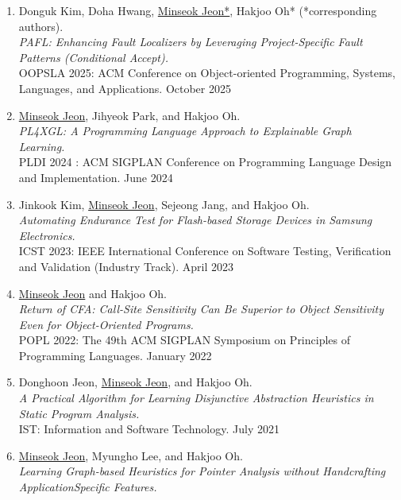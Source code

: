 \documentclass[letterpaper,11pt]{article}
\begin{document}
\begin{enumerate}
  \item {
    Donguk Kim, Doha Hwang, \underline{Minseok Jeon*}, Hakjoo Oh* (*corresponding authors).\\
    \textit{PAFL: Enhancing Fault Localizers by Leveraging Project-Specific Fault Patterns (Conditional Accept).}\\
    OOPSLA 2025: ACM Conference on Object-oriented Programming, Systems, Languages, and Applications. October 2025
  }    
  \item {
    \underline{Minseok Jeon}, Jihyeok Park, and Hakjoo Oh.\\
    \textit{PL4XGL: A Programming Language Approach to Explainable Graph Learning.}\\
    PLDI 2024 : ACM SIGPLAN Conference on Programming Language Design and Implementation. June 2024
  }  
  \item {
    Jinkook Kim, \underline{Minseok Jeon}, Sejeong Jang, and Hakjoo Oh.\\
    \textit{Automating Endurance Test for Flash-based Storage Devices in Samsung Electronics.}\\
    ICST 2023: IEEE International Conference on Software Testing, Verification and Validation (Industry Track). April 2023
  }
  \item{
    \underline{Minseok Jeon} and Hakjoo Oh.\\
    \textit{Return of CFA: Call-Site Sensitivity Can Be Superior to Object Sensitivity Even for
    Object-Oriented Programs.}\\
    POPL 2022: The 49th ACM SIGPLAN Symposium on Principles of Programming Languages. January 2022
  }
  \item{
    Donghoon Jeon, \underline{Minseok Jeon}, and Hakjoo Oh.\\
    \textit{A Practical Algorithm for Learning Disjunctive Abstraction Heuristics in Static Program
    Analysis.}\\
    IST: Information and Software Technology. July 2021
  }
  \item{
    \underline{Minseok Jeon}, Myungho Lee, and Hakjoo Oh.\\
    \textit{Learning Graph-based Heuristics for Pointer Analysis without Handcrafting ApplicationSpecific Features.}\\
}
\end{enumerate}
\end{document}
